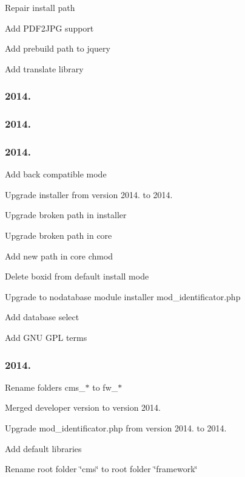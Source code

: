 \begin{DoxyEnumerate}
\item Repair install path
\item Add P\-D\-F2\-J\-P\-G support
\item Add prebuild path to jquery
\item Add translate library
\end{DoxyEnumerate}

\subsubsection*{2014.}

\subsubsection*{2014.}

\subsubsection*{2014.}


\begin{DoxyEnumerate}
\item Add back compatible mode
\item Upgrade installer from version 2014. to 2014.
\item Upgrade broken path in installer
\item Upgrade broken path in core
\item Add new path in core chmod
\item Delete boxid from default install mode
\item Upgrade to nodatabase module installer mod\-\_\-identificator.\-php
\item Add database select
\item Add G\-N\-U G\-P\-L terms
\end{DoxyEnumerate}

\subsubsection*{2014.}


\begin{DoxyEnumerate}
\item Rename folders cms\-\_\-$\ast$ to fw\-\_\-$\ast$
\item Merged developer version to version 2014.
\item Upgrade mod\-\_\-identificator.\-php from version 2014. to 2014.
\item Add default libraries
\item Rename root folder \char`\"{}cms\char`\"{} to root folder \char`\"{}framework\char`\"{}
\end{DoxyEnumerate}

